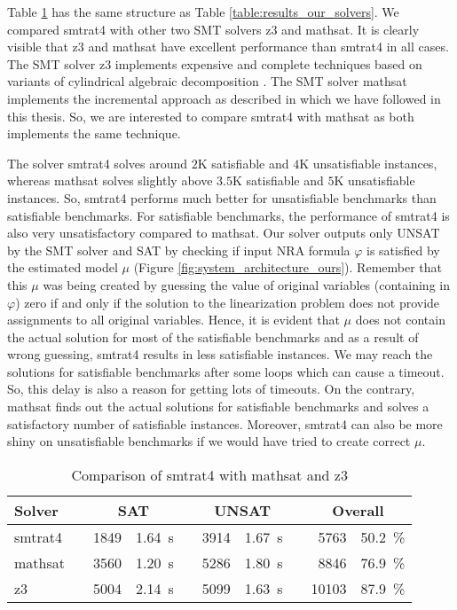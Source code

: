\noindent Table \ref{table:smtrat4_vs_mathsatAndZ3} has the same structure as Table \ref{table:results_our_solvers}.
We compared smtrat4 with other two SMT solvers z3 and mathsat.
It is clearly visible that z3 and mathsat have excellent performance than smtrat4 in all cases.
The SMT solver z3 implements expensive and complete techniques based on variants of cylindrical algebraic decomposition \cite{Cimatti:2018:ILS:3274693.3230639}.
The SMT solver mathsat implements the incremental approach as described in \cite{Cimatti:2018:ILS:3274693.3230639} which we have followed in this thesis.
So, we are interested to compare smtrat4 with mathsat as both implements the same technique.\newline

\noindent The solver smtrat4 solves around $2$K satisfiable and $4$K unsatisfiable instances, whereas mathsat solves slightly above $3.5$K satisfiable and $5$K unsatisfiable instances.
So, smtrat4 performs much better for unsatisfiable benchmarks than satisfiable benchmarks.
For satisfiable benchmarks, the performance of smtrat4 is also very unsatisfactory compared to mathsat.
Our solver outputs only UNSAT by the SMT solver and SAT by checking if input NRA formula $\varphi$ is satisfied by the estimated model $\mu$ (Figure \ref{fig:system_architecture_ours}).
Remember that this $\mu$ was being created by guessing the value of original variables (containing in $\varphi$) zero if and only if the solution to the linearization problem does not provide assignments to all original variables.
Hence, it is evident that $\mu$ does not contain the actual solution for most of the satisfiable benchmarks and as a result of wrong guessing, smtrat4 results in less satisfiable instances.
We may reach the solutions for satisfiable benchmarks after some loops which can cause a timeout.
So, this delay is also a reason for getting lots of timeouts.
On the contrary, mathsat finds out the actual solutions for satisfiable benchmarks and solves a satisfactory number of satisfiable instances.
Moreover, smtrat4 can also be more shiny on unsatisfiable benchmarks if we would have tried to create correct $\mu$.\newline

\begin{table}[!ht]
    \caption{Comparison of smtrat4 with mathsat and z3}    
    \begin{tabularx}{\textwidth}{lXrrXrrXrr}
    	\toprule
    	\textbf{Solver}
    	&& \multicolumn{2}{c}{\textbf{SAT}}
    	&& \multicolumn{2}{c}{\textbf{UNSAT}}
    	&& \multicolumn{2}{c}{\textbf{Overall}}
    	\\
    	\midrule
    	smtrat4
    	&& 1849 & 1.64~s
    	&& 3914 & 1.67~s
    	&& 5763 & 50.2~\%
    	\\
    	mathsat
    	&& 3560 & 1.20~s
    	&& 5286 & 1.80~s
    	&& 8846 & 76.9~\%
    	\\
    	z3
    	&& 5004 & 2.14~s
    	&& 5099 & 1.63~s
    	&& 10103 & 87.9~\%
    	\\
    	\bottomrule
    \end{tabularx}
    \label{table:smtrat4_vs_mathsatAndZ3}
\end{table}

